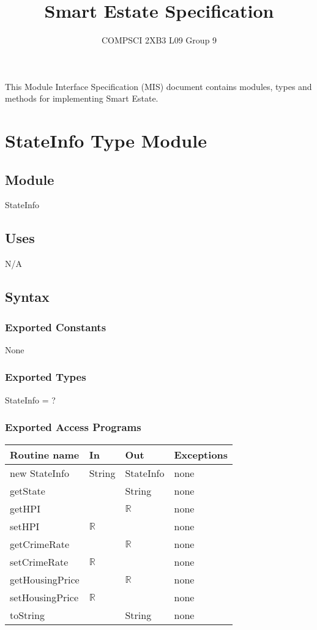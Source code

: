\documentclass[12pt]{article}
\title{Smart Estate Specification}
\author{COMPSCI 2XB3 L09 Group 9}
\begin{document}
\maketitle
This Module Interface Specification (MIS) document contains modules, types and
methods for implementing Smart Estate.

\newpage

\section* {StateInfo Type Module}

\subsection*{Module}

StateInfo

\subsection* {Uses}

N/A

\subsection* {Syntax}

\subsubsection* {Exported Constants}

None

\subsubsection* {Exported Types}

StateInfo = ?

\subsubsection* {Exported Access Programs}

\begin{tabular}{| l | l | l | p{5cm} |}
\hline
\textbf{Routine name} & \textbf{In} & \textbf{Out} & \textbf{Exceptions}\\
\hline
new StateInfo & String & StateInfo & none\\
\hline
getState &  & String & none\\
\hline
getHPI & & $\mathbb{R}$ & none\\
\hline
setHPI & $\mathbb{R}$ &  & none\\
\hline
getCrimeRate & & $\mathbb{R}$ & none\\
\hline
setCrimeRate & $\mathbb{R}$ &  & none\\
\hline
getHousingPrice & & $\mathbb{R}$ & none\\
\hline
setHousingPrice & $\mathbb{R}$ &  & none\\
\hline
toString & & String & none\\
\hline
\end{tabular}
\end{document}

